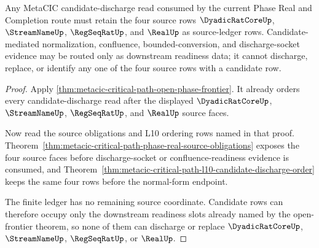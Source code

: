 \begin{theorem}
\label{thm:metacic-critical-path-l10-source-ledger-nonescape}
Any MetaCIC candidate-discharge read consumed by the current Phase Real and Completion route must retain the four source rows $\DyadicRatCoreUp$, $\StreamNameUp$, $\RegSeqRatUp$, and $\RealUp$ as source-ledger rows. Candidate-mediated normalization, confluence, bounded-conversion, and discharge-socket evidence may be routed only as downstream readiness data; it cannot discharge, replace, or identify any one of the four source rows with a candidate row.
\end{theorem}
\begin{proof}
Apply \autoref{thm:metacic-critical-path-open-phase-frontier}. It already orders every candidate-discharge read after the displayed $\DyadicRatCoreUp$, $\StreamNameUp$, $\RegSeqRatUp$, and $\RealUp$ source faces.

Now read the source obligations and L10 ordering rows named in that proof. Theorem~\ref{thm:metacic-critical-path-phase-real-source-obligations} exposes the four source faces before discharge-socket or confluence-readiness evidence is consumed, and Theorem~\ref{thm:metacic-critical-path-l10-candidate-discharge-order} keeps the same four rows before the normal-form endpoint.

The finite ledger has no remaining source coordinate. Candidate rows can therefore occupy only the downstream readiness slots already named by the open-frontier theorem, so none of them can discharge or replace $\DyadicRatCoreUp$, $\StreamNameUp$, $\RegSeqRatUp$, or $\RealUp$.
\end{proof}

